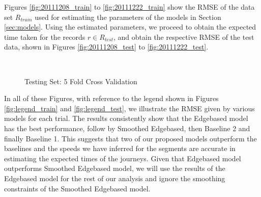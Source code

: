 \documentclass[conference]{IEEEtran.1.8}
\begin{document}
Figures \ref{fig:20111208_train} to \ref{fig:20111222_train} show the RMSE of the data set $R_{train}$ used for estimating the parameters of the models in Section \ref{sec:models}. Using the estimated parameters, we proceed to obtain the expected time taken for the records $r \in R_{test}$, and obtain the respective RMSE of the test data, shown in Figures \ref{fig:20111208_test} to \ref{fig:20111222_test}.
\begin{figure}[htb]
	\centering
	\\
	\caption{Testing Set: 5 Fold Cross Validation}
	\label{fig:5_fold_test}
\end{figure}

In all of these Figures, with reference to the legend shown in Figures \ref{fig:legend_train} and \ref{fig:legend_test}, we illustrate the RMSE given by various models for each trial. The results consistently show that the Edgebased model has the best performance, follow by Smoothed Edgebased, then Baseline 2 and finally Baseline 1. This suggests that two of our proposed models outperform the baselines and the speeds we have inferred for the segments are accurate in estimating the expected times of the journeys. Given that Edgebased model outperforms Smoothed Edgebased model, we will use the results of the Edgebased model for the rest of our analysis and ignore the smoothing constraints of the Smoothed Edgebased model.
\end{document}
